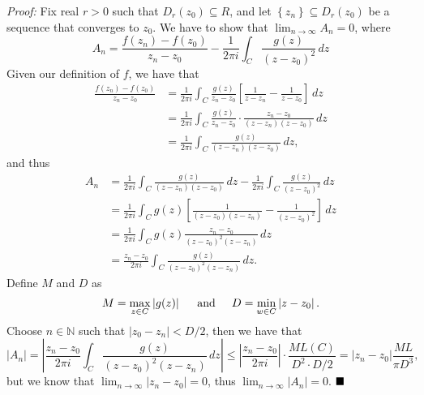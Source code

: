 \documentclass[12pt]{article}
\newcommand{\N}{\mathbb{N}}
\newcommand{\braceb}[1]{\left\{#1\right\}}
\newcommand{\bracketb}[1]{\left[#1\right]}
\newcommand{\vertb}[1]{\left\vert#1\right\vert}
\newcommand{\proof}{\textit{Proof: }}
\newcommand{\done}{\ensuremath{\strut\hfill\blacksquare}}
\begin{document}
\proof
Fix real \( r > 0 \) such that \( D_r(z_0) \subseteq R \), and let
\( \braceb{z_n} \subseteq D_r(z_0) \) be a sequence that converges to \( z_0 \).
We have to show that \( \lim_{n \to \infty} A_n = 0 \), where
\[
	A_n = \frac{f(z_n) - f(z_0)}{z_n - z_0}
	- \frac{1}{2\pi i} \int_C \frac{g(z)}{(z - z_0)^2} \, dz
\]
Given our definition of \( f \), we have that
\begin{align*}
	\frac{f(z_n) - f(z_0)}{z_n - z_0}
	& = \frac{1}{2\pi i} \int_C \frac{g(z)}{z_n - z_0}
	\bracketb{\frac{1}{z - z_n} - \frac{1}{z - z_0}}
	\, dz \\
	& = \frac{1}{2\pi i} \int_C \frac{g(z)}{z_n - z_0} \cdot
	\frac{z_n - z_0}{(z - z_n)(z - z_0)}
	\, dz \\
	& = \frac{1}{2\pi i} \int_C \frac{g(z)}{(z - z_n)(z - z_0)}
	\, dz,
\end{align*}
and thus
\begin{align*}
	A_n & = \frac{1}{2\pi i} \int_C \frac{g(z)}{(z - z_n)(z - z_0)} \, dz
	- \frac{1}{2\pi i} \int_C \frac{g(z)}{(z - z_0)^2} \, dz \\
		& = \frac{1}{2\pi i} \int_C g(z)
		\bracketb{\frac{1}{(z - z_0)(z - z_n)} - \frac{1}{(z - z_0)^2}}
		\, dz \\
		& = \frac{1}{2\pi i} \int_C g(z)
		\frac{z_n - z_0}{(z - z_0)^2(z - z_n)} \, dz \\
		& = \frac{z_n - z_0}{2\pi i} \int_C
		\frac{g(z)}{(z - z_0)^2(z - z_n)} \, dz.
\end{align*}
Define \( M \) and \( D \) as 
\[
	M = \max_{z \in C} \vertb{g(z)}
	\hspace{0.2in} \text{and} \hspace{0.2in}
	D = \min_{w \in C} \vertb{z - z_0}.
\]
Choose \( n \in \N \) such that \( \vertb{z_0 - z_n} < D / 2 \), then we have
that
\[
	\vertb{A_n}
	= \vertb{
		\frac{z_n - z_0}{2\pi i} \int_C \frac{g(z)}{(z - z_0)^2(z - z_n)} \, dz
	}
	\leq \vertb{\frac{z_n - z_0}{2\pi i}} \cdot \frac{ML(C)}{D^2 \cdot D / 2}
	= \vertb{z_n - z_0} \frac{ML}{\pi D^3},
\]
but we know that \( \lim_{n \to \infty} \vertb{z_n - z_0} = 0 \), thus
\( \lim_{n \to \infty} \vertb{A_n} = 0 \).
\done
\end{document}
